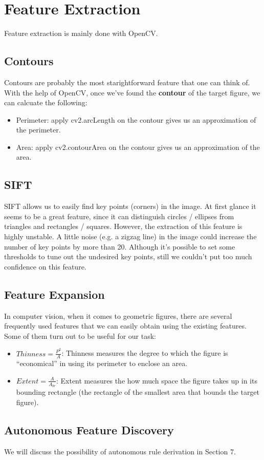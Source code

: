 \section{Feature Extraction}

Feature extraction is mainly done with OpenCV. 

\subsection{Contours}

Contours are probably the most starightforward feature that one can think of. With the help of OpenCV, once we've found the \textbf{contour} of the target figure, we can calcuate the following:

\begin{itemize}
\item Perimeter: apply cv2.arcLength on the contour gives us an approximation of the perimeter.
\item Area: apply cv2.contourArea on the contour gives us an approximation of the area.
\end{itemize}

\subsection{SIFT}

SIFT allows us to easily find key points (corners) in the image. At first glance it seems to be a great feature, since it can distinguish circles / ellipses from triangles and rectangles / squares. However, the extraction of this feature is highly unstable. A little noise (e.g. a zigzag line) in the image could increase the number of key points by more than 20. Although it's possible to set some thresholds to tune out the undesired key points, still we couldn't put too much confidence on this feature.

\subsection{Feature Expansion}

In computer vision, when it comes to geometric figures, there are several frequently used features that we can easily obtain using the existing features. Some of them turn out to be useful for our task:

\begin{itemize}
\item $Thinness = \frac{P^2}{A}$: Thinness measures the degree to which the figure is ``economical'' in using its perimeter to enclose an area. 
\item $Extent = \frac{A}{A_{br}}$: Extent measures the how much space the figure takes up in its bounding rectangle (the rectangle of the smallest area that bounds the target figure).
\end{itemize}

\subsection{Autonomous Feature Discovery}

We will discuss the possibility of autonomous rule derivation in Section 7.
